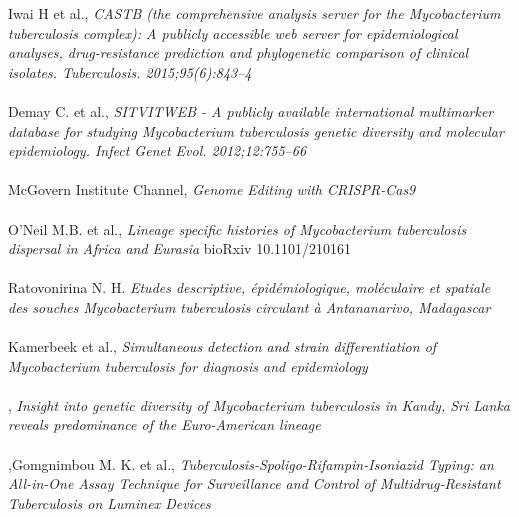 \documentclass[twoside,a4paper,11pt,frenchb,openany]{report}
\begin{document}
\begin{thebibliography}{10}
Iwai H et al., \textit{CASTB (the comprehensive analysis server for the Mycobacterium tuberculosis complex): A publicly accessible web server for epidemiological analyses, drug-resistance prediction and phylogenetic comparison of clinical isolates. Tuberculosis. 2015;95(6):843–4}\\ \\

Demay C. et al., \textit{SITVITWEB - A publicly available international multimarker database for studying Mycobacterium tuberculosis genetic diversity and molecular epidemiology. Infect Genet Evol. 2012;12:755–66}\\ \\

\bibitem{}McGovern Institute Channel, \textit{Genome Editing with CRISPR-Cas9}\\ \\

O'Neil M.B. et al., \textit{Lineage specific histories of Mycobacterium tuberculosis dispersal in Africa and Eurasia}
bioRxiv 10.1101/210161\\ \\

Ratovonirina N. H. \textit{Etudes descriptive, épidémiologique, moléculaire et spatiale des souches Mycobacterium tuberculosis circulant à Antananarivo, Madagascar}\\ \\

Kamerbeek et al., \textit{Simultaneous detection and strain differentiation of Mycobacterium tuberculosis for diagnosis and epidemiology}\\ \\

, \textit{Insight into genetic diversity of Mycobacterium tuberculosis in Kandy, Sri Lanka reveals predominance of the Euro-American lineage}\\ \\

,Gomgnimbou M. K. et al., \textit{Tuberculosis-Spoligo-Rifampin-Isoniazid Typing: an All-in-One Assay Technique for Surveillance and Control of Multidrug-Resistant Tuberculosis on Luminex Devices}

\end{thebibliography}
\end{document}
